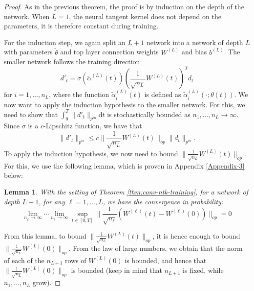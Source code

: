 \documentclass{article}
\newtheorem{lem}{Lemma}
\begin{document}
\begin{proof}
As in the previous theorem, the proof is by induction on the depth of the network. When $L=1$, the neural tangent kernel does not depend on the parameters, it is therefore constant during training.

For the induction step, we again split an $L+1$ network into a network of depth $L$ with parameters $\tilde{\theta}$ and top layer connection weights $W^{(L)}$ and bias $b^{(L)}$. The smaller network follows the training direction
$$
 d'_{t} =  \dot{\sigma}\left(\tilde{\alpha}^{(L)}(t)\right) \left(\frac{1}{\sqrt{n_L}}W^{(L)}(t)\right)^T d_t \label{eq:direct-small-network}
$$
for $i=1, \ldots, n_L$, where the function $\tilde{\alpha}^{(L)}_i(t) $ is defined as $ \tilde{\alpha}^{(L)}_i(\cdot ; \theta(t))$. We now want to apply the induction hypothesis to the smaller network. For this, we need to show that
$ \int_{0}^{T} \lVert d'_t \rVert_{p^{in}} \mathrm{d} t $ is stochastically bounded as $ n_1, \ldots, n_L \to \infty $.  Since $ \sigma $ is a $c$-Lipschitz function, we have
that 
\[
	\lVert d'_t \rVert_{p^{in}} \leq c \lVert  \frac{1}{\sqrt{n_L}} W^{(L)} (t) \rVert_{op}
	\lVert d_t \rVert_{p^{in}}.
\] 
To apply the induction hypothesis, we now need to bound $ \lVert  \frac{1}{\sqrt{n_L}} W^{(L)} (t) \rVert_{op} $. For this, we use the following lemma, which is proven in Appendix \ref{Appendix-3} below:

\begin{lem} \label{lem:control-w}
With the setting of Theorem \ref{thm:conv-ntk-training}, for a network of depth $ L + 1$, for any $ \ell =1, \ldots, L $, we have the convergence in probability:  \[ 
\lim_{n_L \to \infty} \cdots \lim_{n_1 \to \infty} 	
\sup_{t \in [0, T]} \lVert \frac{1}{\sqrt{n_\ell}} \left( W^{(\ell)}(t) - W^{(\ell)}(0) \right) \rVert_{op} = 0
\]
\end{lem}

From this lemma, to bound  $ \lVert  \frac{1}{\sqrt{n_L}} W^{(L)} (t) \rVert_{op} $, it is hence enough to bound $ \lVert  \frac{1}{\sqrt{n_L}} W^{(L)} (0) \rVert_{op} $. From the law of large numbers, we obtain that the norm of each of the $ n_{L + 1} $ rows of $ W^{(L)} (0) $ is bounded, and hence that $ \lVert  \frac{1}{\sqrt{n_L}} W^{(L)} (0) \rVert_{op} $ is bounded (keep in mind that $ n_{L + 1} $ is fixed, while $ n_1, \ldots, n_L $ grow).


\end{proof}
\end{document}
